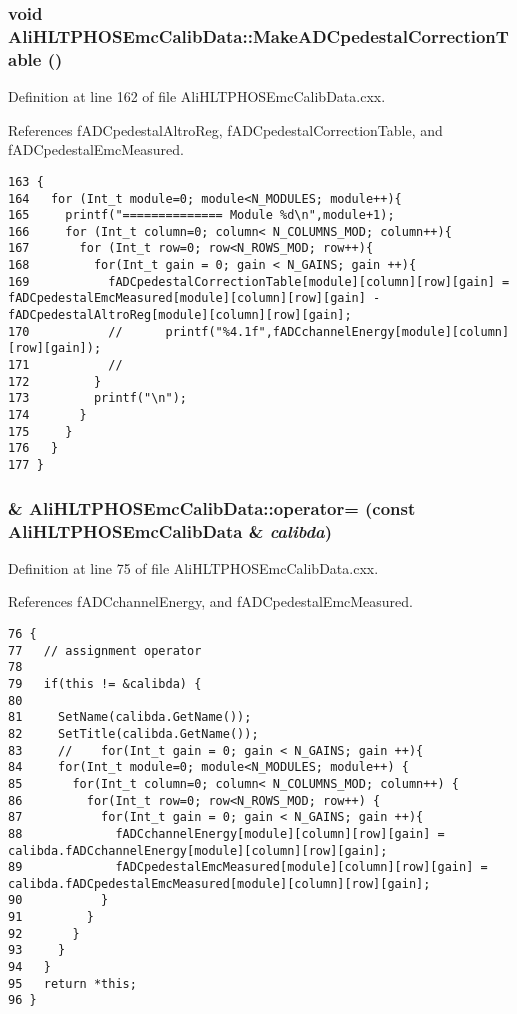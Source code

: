 \subsubsection{\setlength{\rightskip}{0pt plus 5cm}void Ali\-HLTPHOSEmc\-Calib\-Data::Make\-ADCpedestal\-Correction\-Table ()}\label{classAliHLTPHOSEmcCalibData_AliHLTPHOSEmcCalibDataa11}




Definition at line 162 of file Ali\-HLTPHOSEmc\-Calib\-Data.cxx.

References f\-ADCpedestal\-Altro\-Reg, f\-ADCpedestal\-Correction\-Table, and f\-ADCpedestal\-Emc\-Measured.

\footnotesize\begin{verbatim}163 {
164   for (Int_t module=0; module<N_MODULES; module++){
165     printf("============== Module %d\n",module+1);
166     for (Int_t column=0; column< N_COLUMNS_MOD; column++){
167       for (Int_t row=0; row<N_ROWS_MOD; row++){
168         for(Int_t gain = 0; gain < N_GAINS; gain ++){ 
169           fADCpedestalCorrectionTable[module][column][row][gain] = fADCpedestalEmcMeasured[module][column][row][gain] - fADCpedestalAltroReg[module][column][row][gain];
170           //      printf("%4.1f",fADCchannelEnergy[module][column][row][gain]);
171           //
172         }
173         printf("\n");
174       }
175     }
176   }    
177 }
\end{verbatim}\normalsize 


\subsubsection{ \& Ali\-HLTPHOSEmc\-Calib\-Data::operator= (const {\bf Ali\-HLTPHOSEmc\-Calib\-Data} \& {\em calibda})}\label{classAliHLTPHOSEmcCalibData_AliHLTPHOSEmcCalibDataa3}




Definition at line 75 of file Ali\-HLTPHOSEmc\-Calib\-Data.cxx.

References f\-ADCchannel\-Energy, and f\-ADCpedestal\-Emc\-Measured.

\footnotesize\begin{verbatim}76 {
77   // assignment operator
78 
79   if(this != &calibda) { 
80 
81     SetName(calibda.GetName());
82     SetTitle(calibda.GetName());
83     //    for(Int_t gain = 0; gain < N_GAINS; gain ++){
84     for(Int_t module=0; module<N_MODULES; module++) {
85       for(Int_t column=0; column< N_COLUMNS_MOD; column++) {
86         for(Int_t row=0; row<N_ROWS_MOD; row++) {
87           for(Int_t gain = 0; gain < N_GAINS; gain ++){
88             fADCchannelEnergy[module][column][row][gain] = calibda.fADCchannelEnergy[module][column][row][gain];
89             fADCpedestalEmcMeasured[module][column][row][gain] = calibda.fADCpedestalEmcMeasured[module][column][row][gain];
90           }
91         }
92       }
93     }
94   }
95   return *this;
96 }
\end{verbatim}\normalsize 


